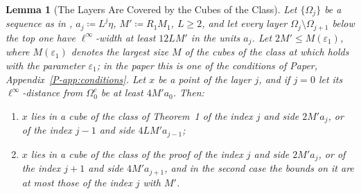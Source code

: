 \documentclass[11pt]{preprint}
\numberwithin{equation}{section}
\newtheorem{lemma}{Lemma}[section]
\theoremstyle{definition}
\theoremstyle{remark}
\theoremstyle{plain}
\begin{document}
\begin{lemma}[The Layers Are Covered by the Cubes of the Class]\label{lem:var-covering}
Let $\{\Omega_j\}$ be a sequence as in \cite[(1)--(4), p.~277]{BalabanVAR}, $a_j \coloneqq L^j\eta$, $M' \coloneqq R_1M_1$, $L \geq 2$, and let every layer $\Omega_j \setminus \Omega_{j+1}$ below the top one have $\ell^\infty$-width at least $12LM'$ in the units $a_j$. Let $2M' \leq M(\varepsilon_1)$, where $M(\varepsilon_1)$ denotes the largest size $M$ of the cubes of the class at which \cite[Theorem~1]{BalabanVAR} holds with the parameter $\varepsilon_1$; in the paper this is one of the conditions of Paper, Appendix~\ref{P-app:conditions}. Let $x$ be a point of the layer $j$, and if $j = 0$ let its $\ell^\infty$-distance from $\Omega_0^c$ be at least $4M'a_0$. Then:
\begin{enumerate}[label=(\alph*)]
\item $x$ lies in a cube of the class of Theorem~1 of the index $j$ and side $2M'a_j$, or of the index $j - 1$ and side $4LM'a_{j-1}$;
\item $x$ lies in a cube of the class of the proof of the index $j$ and side $2M'a_j$, or of the index $j + 1$ and side $4M'a_{j+1}$, and in the second case the bounds \cite[(9)--(10)]{BalabanVAR} on it are at most those of the index $j$ with $M'$.
\end{enumerate}
\end{lemma}
\end{document}
